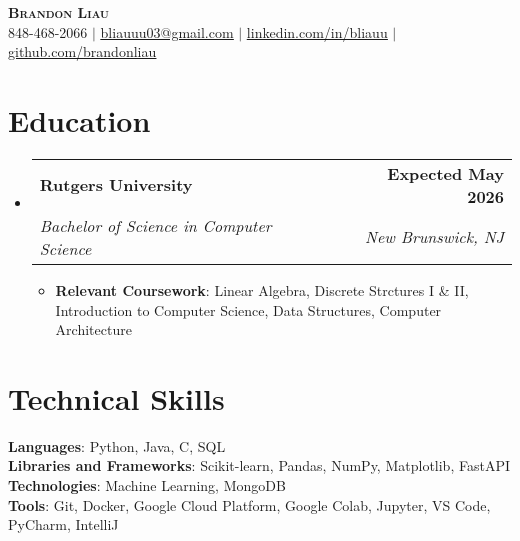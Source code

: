 \documentclass[letterpaper,11pt]{article}
\makeatletter
\newcommand{\resumeItem}[1]{
  \item\small{
    {#1 \vspace{-2pt}}
  }
}
\newcommand{\resumeSubheading}[4]{
  \vspace{-2pt}\item
    \begin{tabular*}{0.97\textwidth}[t]{l@{\extracolsep{\fill}}r}
      \textbf{#1} & #2 \\
      \textit{\small#3} & \textit{\small #4} \\
    \end{tabular*}\vspace{-7pt}
}
\newcommand{\resumeSubHeadingListStart}{\begin{itemize}[leftmargin=0.15in, label={}]}
\newcommand{\resumeSubHeadingListEnd}{\end{itemize}}
\newcommand{\resumeItemListStart}{\begin{itemize}}
\newcommand{\resumeItemListEnd}{\end{itemize}\vspace{-3pt}}
\makeatother
\begin{document}
\begin{center}
    \textbf{\Huge \scshape Brandon Liau} \\ \vspace{7pt}
    \small {} 848-468-2066 $|$ 
    \href{mailto:x@x.com}{ \underline{bliauuu03@gmail.com}} $|$ 
    \href{https://linkedin.com/in/bliauu}{ \underline{linkedin.com/in/bliauu}} $|$
    \href{https://github.com/brandonliau}{ \underline{github.com/brandonliau}}
\end{center}


\section{Education}
  \resumeSubHeadingListStart
    \resumeSubheading
      {Rutgers University}{\textbf{Expected May 2026}}
      {Bachelor of Science in Computer Science}{New Brunswick, NJ}
      \resumeItemListStart
        \resumeItem{\textbf{Relevant Coursework}: Linear Algebra, Discrete Strctures I \& II, Introduction to Computer Science, Data Structures, Computer Architecture}
      \resumeItemListEnd
  \resumeSubHeadingListEnd


\section{Technical Skills}
 \begin{itemize}[leftmargin=0.15in, label={}]
    \small{\item{
     \textbf{Languages}{: Python, Java, C, SQL} \vspace{1.3pt}\\
     \textbf{Libraries and Frameworks}{: Scikit-learn, Pandas, NumPy, Matplotlib, FastAPI} \vspace{1.3pt}\\
     \textbf{Technologies}{: Machine Learning, MongoDB} \vspace{1.3pt}\\
     \textbf{Tools}{: Git, Docker, Google Cloud Platform, Google Colab, Jupyter, VS Code, PyCharm, IntelliJ} \\
    }}
 \end{itemize}


\end{document}
